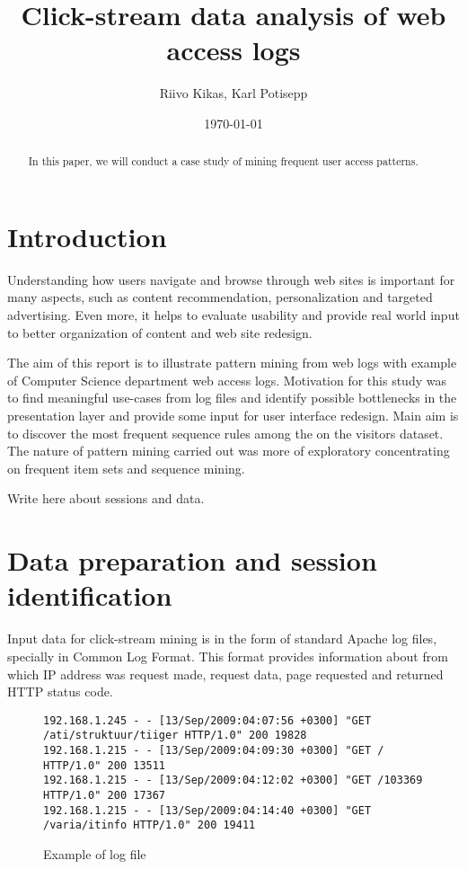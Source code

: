\documentclass[english,a4paper]{article}
\begin{document}
\title{Click-stream data analysis of web access logs}
\author{Riivo Kikas, Karl Potisepp}
\date{\today}
\maketitle

\begin{abstract}
In this paper, we will conduct a case study of mining frequent user access patterns.

\end{abstract}

\section{Introduction}
Understanding how users navigate and browse through web sites is important for many aspects, such as content recommendation, personalization and targeted advertising. Even more, it helps to evaluate usability and provide real world input to better organization of content and web site redesign. 

The aim of this report is to illustrate pattern mining from web logs with example of Computer Science department web access logs.  Motivation for this study was to find meaningful use-cases from log files and identify possible bottlenecks in the presentation layer and provide some input for user interface redesign. Main aim is to discover the most frequent sequence rules among the on the visitors dataset. The nature of pattern mining carried out was more of exploratory concentrating on frequent item sets and sequence mining.

Write here about sessions and data.

\section{Data preparation and session identification}
Input data for click-stream mining is in the form of standard Apache log files, specially in Common Log Format. This format provides information about from which IP address was request made, request data, page requested and returned HTTP status code.

\begin{figure}
\begin{verbatim}
192.168.1.245 - - [13/Sep/2009:04:07:56 +0300] "GET /ati/struktuur/tiiger HTTP/1.0" 200 19828
192.168.1.215 - - [13/Sep/2009:04:09:30 +0300] "GET / HTTP/1.0" 200 13511
192.168.1.215 - - [13/Sep/2009:04:12:02 +0300] "GET /103369 HTTP/1.0" 200 17367
192.168.1.215 - - [13/Sep/2009:04:14:40 +0300] "GET /varia/itinfo HTTP/1.0" 200 19411
\end{verbatim}
\caption{Example of log file}
\end{figure}
\end{document}
